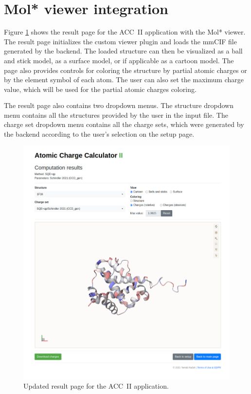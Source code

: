 \documentclass[
  digital,     %
  oneside,     %
  nosansbold,  %
  nocolorbold, %
  lof,         %
  lot,         %
]{fithesis4}
\begin{document}
\section{Mol* viewer integration}
\label{section:viewer_integration}

Figure \ref{fig:result_page} shows the result page for the ACC~II application with the Mol* viewer. The result page initializes the custom viewer plugin and loads the mmCIF file generated by the backend. The loaded structure can then be visualized as a ball and stick model, as a surface model, or if applicable as a cartoon model. The page also provides controls for coloring the structure by partial atomic charges or by the element symbol of each atom. The user can also set the maximum charge value, which will be used for the partial atomic charges coloring.

The result page also contains two dropdown menus. The structure dropdown menu contains all the structures provided by the user in the input file. The charge set dropdown menu contains all the charge sets, which were generated by the backend according to the user's selection on the setup page.

\begin{figure}[htbp]
  \begin{center}
    \includegraphics[width=\textwidth]{figures/results-full.png}
  \end{center}
  \caption{Updated result page for the ACC~II application.}
  \label{fig:result_page}
\end{figure}
\end{document}
